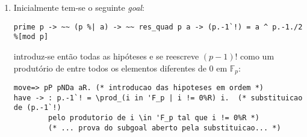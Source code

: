 \begin{enumerate}
        \item Inicialmente tem-se o seguinte \textit{goal}:
        \begin{tcolorbox}[colback=green!50!white,colframe=green!100!black,width=14.7cm]
        \begin{lstlisting}[language=coq]
prime p -> ~~ (p %| a) -> ~~ res_quad p a -> (p.-1`!) = a ^ p.-1./2 %[mod p]
        \end{lstlisting}
        \end{tcolorbox}
        introduz-se então todas as hipóteses e se reescreve $(p-1)!$ como um produtório de entre todos os elementos diferentes de $0$ em $\mathbb{F}_p$:
        \begin{lstlisting}[language=coq]
move=> pP pNDa aR. (* introducao das hipoteses em ordem *)
have -> : p.-1`! = \prod_(i in 'F_p | i != 0%R) i.  (* substituicao de (p.-1`!) 
        pelo produtorio de i \in 'F_p tal que i != 0%R *) 
        (* ... prova do subgoal aberto pela substituicao... *)
        \end{lstlisting}


\end{enumerate}
